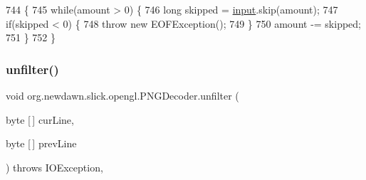 \begin{DoxyCode}
744                                                       \{
745         \textcolor{keywordflow}{while}(amount > 0) \{
746             \textcolor{keywordtype}{long} skipped = \mbox{\hyperlink{classorg_1_1newdawn_1_1slick_1_1opengl_1_1_p_n_g_decoder_a5714583b8e4e668d86f45065cda6e20b}{input}}.skip(amount);
747             \textcolor{keywordflow}{if}(skipped < 0) \{
748                 \textcolor{keywordflow}{throw} \textcolor{keyword}{new} EOFException();
749             \}
750             amount -= skipped;
751         \}
752     \}
\end{DoxyCode}
\mbox{\label{classorg_1_1newdawn_1_1slick_1_1opengl_1_1_p_n_g_decoder_acc27514c9030ef279d2322f986bde82a}} 
\subsubsection{\texorpdfstring{unfilter()}{unfilter()}}
{\footnotesize\ttfamily void org.\+newdawn.\+slick.\+opengl.\+P\+N\+G\+Decoder.\+unfilter (\begin{DoxyParamCaption}\item[{byte \mbox{[}$\,$\mbox{]}}]{cur\+Line,  }\item[{byte \mbox{[}$\,$\mbox{]}}]{prev\+Line }\end{DoxyParamCaption}) throws I\+O\+Exception\hspace{0.3cm}{\ttfamily [inline]}, {\ttfamily [private]}}


